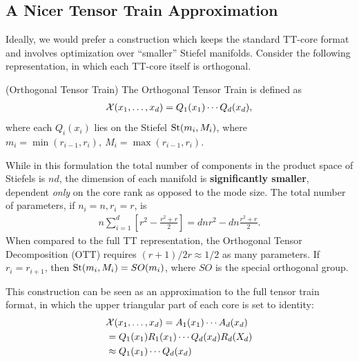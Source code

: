 \subsection{A Nicer Tensor Train Approximation}
Ideally, we would prefer a construction which keeps the standard TT-core format and involves optimization over ``smaller'' Stiefel manifolds. Consider the following representation, in which each TT-core itself is orthogonal.
\begin{definition}\label{def:ott}(Orthogonal Tensor Train)
The Orthogonal Tensor Train is defined as
\begin{align}
\mathcal{X}(x_1,\ldots,x_d) = Q_1(x_1) \cdots Q_d(x_d),
\end{align}
where each $Q_i(x_i)$ lies on the Stiefel $\text{St}(m_i, M_i)$, where $m_i = \min(r_{i-1},r_i), \ M_i = \max(r_{i-1},r_i)$.
\end{definition}
While in this formulation the total number of components in the product space of Stiefels is $nd$, the dimension of each manifold is \textbf{significantly smaller},
dependent {\em only} on the core rank as opposed to the mode size.
The total number of parameters, if $n_i =n, r_i = r$, is
\begin{align}
n \sum_{i=1}^d \left[ r^2 - \frac{r^2 + r}{2}\right] = d n r^2 - dn\frac{r^2 + r}{2}.
\end{align}
When compared to the full TT representation,
the Orthogonal Tensor Decomposition (OTT) requires
$(r+1)/2r \approx 1/2$ as many parameters.
If $r_i=r_{i+1}$, then $\text{St}(m_i, M_i) = SO(m_i)$, where $SO$ is the special orthogonal group.

This construction can be seen as an approximation to the full tensor train format, in which the upper triangular part of each core is set to identity:
\begin{align}
    &\mathcal{X}(x_1,\ldots,x_d) = A_1(x_1)\cdots A_d(x_d) \nonumber\\ &= Q_1(x_1)R_1(x_1)\cdots Q_d(x_d)R_d(X_d) \nonumber\\
    &\approx Q_1(x_1) \cdots Q_d(x_d)
\end{align}

